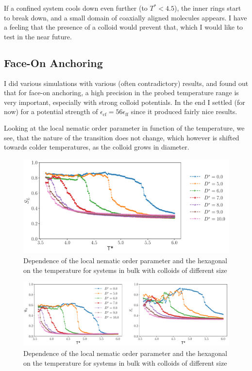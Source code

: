 If a confined system cools down even further (to $T^*< 4.5$), the inner rings start to break down, and a small domain of coaxially aligned molecules appears.
I have a feeling that the presence of a colloid would prevent that, which I would like to test in the near future. 


\label{sec:confinedsystem}
\subsection{Face-On Anchoring}
I did various simulations with various (often contradictory) results, and found out that for face-on anchoring, a high precision in the probed temperature range is very important, especially with strong colloid potentials. In the end I settled (for now) for a potential strength of $\epsilon_{\text{cf}}= 56\epsilon_{\text{ff}}$ since it produced fairly nice results.


Looking at the local nematic order parameter in function of the temperature, we see, that the nature of the transition does not change, which however is shifted towards colder temperatures, as the colloid grows in diameter.

\begin{figure}[H]
    \centering
	\includegraphics[width=\linewidth]{plots/cfo_W8C56_nemloc.pdf}
	\caption{Dependence of the local nematic order parameter and the hexagonal on the temperature for systems in bulk with colloids of different size}
    \label{fig:beoc32lochex}
\end{figure}
\begin{figure}[H]
    \centering
	\includegraphics[width=\linewidth]{plots/cfo_W8C56_hexcirc.pdf}
	\caption{Dependence of the local nematic order parameter and the hexagonal on the temperature for systems in bulk with colloids of different size}
    \label{fig:cfohexcirc}
\end{figure}

